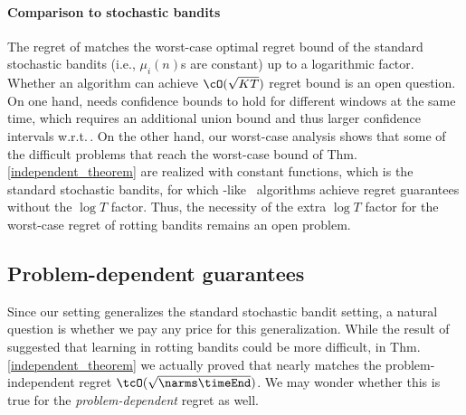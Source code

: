 \paragraph{Comparison to stochastic bandits}
The regret of \FEWA matches the worst-case optimal regret bound of the standard stochastic bandits (i.e., $\mu_i(n)$s are constant) up to a logarithmic factor. Whether an algorithm can achieve $\cO(\sqrt{KT})$ regret bound is an open question. On one hand, \FEWA needs confidence bounds to hold for different windows at the same time, which requires an additional union bound and thus larger confidence intervals w.r.t.\,\UCBone. On the other hand, our worst-case analysis shows that some of the difficult problems that reach the worst-case bound of Thm.\,\ref{independent_theorem} are realized with constant 
functions, which is the standard stochastic bandits, for which \MOSS-like~\citep{audibert2009minimax} algorithms achieve regret guarantees without the $\log T$ factor. Thus, the necessity of the extra $\log T$ factor for the worst-case regret of rotting bandits remains an open problem.



\subsection{Problem-dependent guarantees}
\label{ss:dep}
\vspace{-0.1in}

Since our setting generalizes the standard stochastic bandit setting, a natural question is whether we pay any price for this generalization. While the result of~\citet{levine2017rotting} suggested that learning in rotting bandits could be more difficult, in Thm.\,\ref{independent_theorem} we actually proved that \myAlgorithm nearly matches the problem-independent regret $\tcO(\sqrt{\narms\timeEnd})$. We may wonder whether this is true for the \emph{problem-dependent} regret as well.

